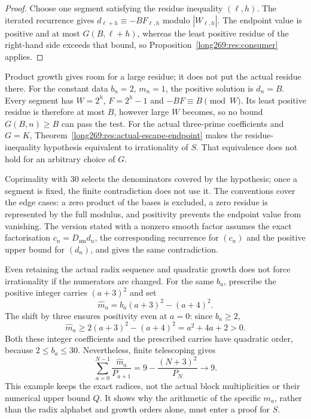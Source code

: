 \documentclass[11pt]{article}
\theoremstyle{remark}
\theoremstyle{plain}
\begin{document}
\begin{proof}
Choose one segment satisfying the residue inequality $(\ell,h)$.  The iterated recurrence gives
$d_{\ell+h}\equiv-BF_{\ell,h}$ modulo $|W_{\ell,h}|$.  The endpoint value is
positive and at most $G(B,\ell+h)$, whereas the least positive residue of
the right-hand side exceeds that bound, so Proposition~\ref{long269:res:consumer}
applies.
\end{proof}

Product growth gives room for a large residue; it does not put the
actual residue there. For the constant data $b_n=2$, $m_n=1$, the positive
solution is $d_n=B$. Every segment has $W=2^h$, $F=2^h-1$ and
$-BF\equiv B\pmod W$. Its least positive residue is therefore at most
$B$, however large $W$ becomes, so no bound $G(B,n)\ge B$ can pass the
test.  For the actual three-prime coefficients and $G=K$,
Theorem~\ref{long269:res:actual-escape-endpoint} makes the residue-inequality hypothesis
equivalent to irrationality of $S$.  That equivalence does not hold for
an arbitrary choice of $G$.

Coprimality with $30$ selects the denominators covered by the hypothesis;
once a segment is fixed, the finite contradiction does not use it.  The conventions cover the edge cases: a zero product of the bases is excluded, a zero residue is
represented by the full modulus, and positivity prevents the endpoint value from vanishing.  The version stated with a nonzero smooth factor assumes the exact
factorisation $c_n=D_{\mathrm{sm}}d_n$, the corresponding recurrence for
$(c_n)$ and the positive upper bound for $(d_n)$, and gives the same
contradiction.

Even retaining the actual radix sequence and quadratic growth does not
force irrationality if the numerators are changed.  For the same $b_a$,
prescribe the positive integer carries $(a+3)^2$ and set
\[
 \widehat m_a=b_a(a+3)^2-(a+4)^2.
\]
The shift by three ensures positivity even at $a=0$: since $b_a\ge2$,
\[
 \widehat m_a\ge2(a+3)^2-(a+4)^2=a^2+4a+2>0.
\]
Both these integer coefficients and the prescribed carries have quadratic
order, because $2\le b_a\le30$.  Nevertheless, finite telescoping gives
\[
 \sum_{a=0}^{N-1}\frac{\widehat m_a}{P_{a+1}}
 =9-\frac{(N+3)^2}{P_N}\longrightarrow9.
\]
This example keeps the exact radices, not the actual block multiplicities
or their numerical upper bound $Q$.  It shows why the arithmetic of the
specific $m_a$, rather than the radix alphabet and growth orders alone,
must enter a proof for $S$.
\end{document}
